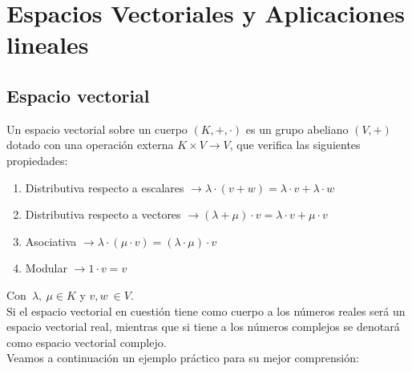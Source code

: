 \documentclass[0_algebra.tex]{subfiles}
\begin{document}

\chapter{Espacios Vectoriales y Aplicaciones lineales}
\section{Espacio vectorial}
Un espacio vectorial sobre un cuerpo $(K,+,\cdot)$ es un grupo abeliano $(V,+)$ dotado con una operación externa $K \times V \rightarrow V$, que verifica las siguientes propiedades:
\begin{enumerate}
\item Distributiva respecto a escalares $\rightarrow \lambda\cdot(v+w)=\lambda\cdot v+\lambda \cdot w$
\item Distributiva respecto a vectores $\rightarrow (\lambda + \mu)\cdot v= \lambda \cdot v+ \mu \cdot v$
\item Asociativa $\rightarrow \lambda \cdot (\mu \cdot v)=(\lambda \cdot \mu)\cdot v$
\item Modular $\rightarrow 1 \cdot v = v$
\end{enumerate}
Con\  $\lambda,\ \mu \in K$ y $v, w \ \in V$.\\
Si el espacio vectorial en cuestión tiene como cuerpo a los números reales será un espacio vectorial real, mientras que si tiene a los números complejos se denotará como espacio vectorial complejo.\\
Veamos a continuación un ejemplo práctico para su mejor comprensión:
\newpage
\end{document}
